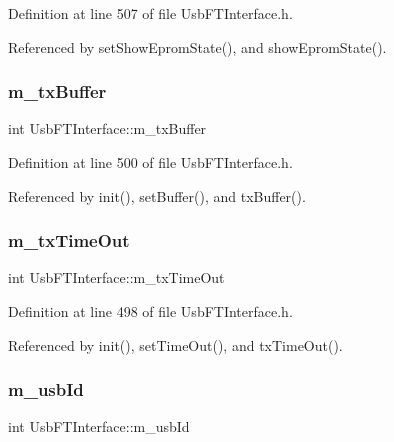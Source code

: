 Definition at line 507 of file Usb\+F\+T\+Interface.\+h.



Referenced by set\+Show\+Eprom\+State(), and show\+Eprom\+State().

\mbox{\label{classUsbFTInterface_a10385649160531f6976d55176bee1f2d}} 
\subsubsection{\texorpdfstring{m\+\_\+tx\+Buffer}{m\_txBuffer}}
{\footnotesize\ttfamily int Usb\+F\+T\+Interface\+::m\+\_\+tx\+Buffer\hspace{0.3cm}{\ttfamily [private]}}



Definition at line 500 of file Usb\+F\+T\+Interface.\+h.



Referenced by init(), set\+Buffer(), and tx\+Buffer().

\mbox{\label{classUsbFTInterface_af88e498a8ed759e35ae9e94f74ffcf56}} 
\subsubsection{\texorpdfstring{m\+\_\+tx\+Time\+Out}{m\_txTimeOut}}
{\footnotesize\ttfamily int Usb\+F\+T\+Interface\+::m\+\_\+tx\+Time\+Out\hspace{0.3cm}{\ttfamily [private]}}



Definition at line 498 of file Usb\+F\+T\+Interface.\+h.



Referenced by init(), set\+Time\+Out(), and tx\+Time\+Out().

\mbox{\label{classUsbFTInterface_a91df5c0547e8be460bc087e27afe05aa}} 
\subsubsection{\texorpdfstring{m\+\_\+usb\+Id}{m\_usbId}}
{\footnotesize\ttfamily int Usb\+F\+T\+Interface\+::m\+\_\+usb\+Id\hspace{0.3cm}{\ttfamily [private]}}



